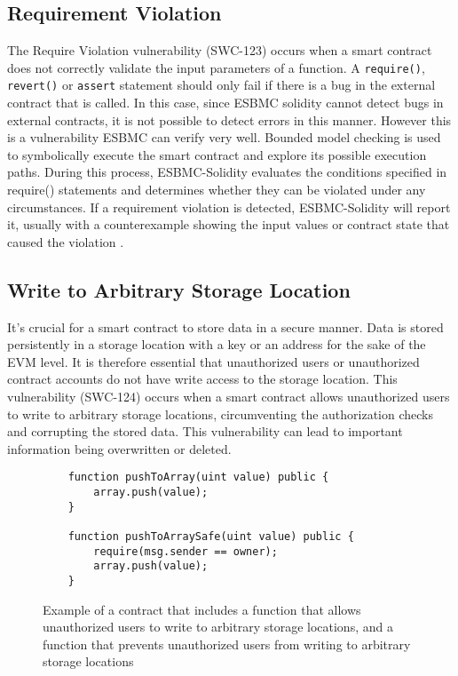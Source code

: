 \subsection{Requirement Violation}
\label{sec:requirement_violation}

The Require Violation vulnerability (SWC-123) occurs when a smart contract does not correctly validate the input parameters of a function. A \verb|require()|, \verb|revert()| or \verb|assert| statement should only fail if there is a bug in the external contract that is called. In this case, since ESBMC solidity cannot detect bugs in external contracts, it is not possible to detect errors in this manner. However this is a vulnerability ESBMC can verify very well.  Bounded model checking is used to symbolically execute the smart contract and explore its possible execution paths. During this process, ESBMC-Solidity evaluates the conditions specified in require() statements and determines whether they can be violated under any circumstances. If a requirement violation is detected, ESBMC-Solidity will report it, usually with a counterexample showing the input values or contract state that caused the violation \cite{salim2022esbmc}.
\subsection{Write to Arbitrary Storage Location}
\label{sec:write_to_arbitrary_storage_location}

It's crucial for a smart contract to store data in a secure manner. Data is stored persistently in a storage location with a key or an address for the sake of the EVM level. It is therefore essential that unauthorized users or unauthorized contract accounts do not have write access to the storage location. This vulnerability (SWC-124) occurs when a smart contract allows unauthorized users to write to arbitrary storage locations, circumventing the authorization checks and corrupting the stored data. This vulnerability can lead to important information being overwritten or deleted.

\begin{figure}
\begin{lstlisting}
    function pushToArray(uint value) public {
        array.push(value);
    }

    function pushToArraySafe(uint value) public {
        require(msg.sender == owner);
        array.push(value);
    }
\end{lstlisting}
\caption{Example of a contract that includes a function that allows unauthorized users to write to arbitrary storage locations, and a function that prevents unauthorized users from writing to arbitrary storage locations}
\label{fig:write_to_arbitrary_storage_location}
\end{figure}


